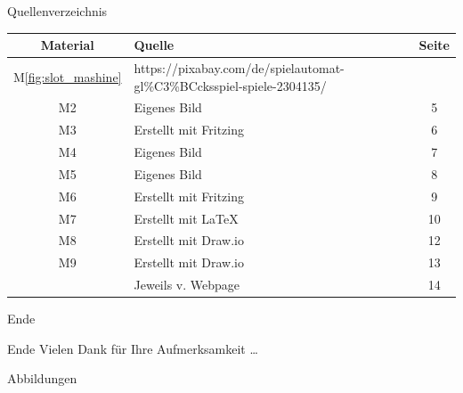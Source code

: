 \documentclass[mathserif,9pt]{article}
\begin{document}
    \begin{frame}{Quellenverzeichnis}
        \begin{block}{}
            \footnotesize
            \begin{tabular}{clc}
                Material & Quelle & Seite \\
                \hline
                M\ref{fig:slot_mashine} & https://pixabay.com/de/spielautomat-gl\%C3\%BCcksspiel-spiele-2304135/ & \pageref{fig:slot_mashine} \\
                M2 & Eigenes Bild & 5 \\
                M3 & Erstellt mit Fritzing & 6 \\
                M4 & Eigenes Bild & 7 \\
                M5 & Eigenes Bild & 8 \\
                M6 & Erstellt mit Fritzing & 9 \\
                M7 & Erstellt mit \LaTeX & 10 \\
                M8 & Erstellt mit Draw.io & 12 \\
                M9 & Erstellt mit Draw.io & 13 \\
                & Jeweils v. Webpage & 14
            \end{tabular}
        \end{block}
    \end{frame}
    
    \begin{frame}{Ende}
        \begin{block}{Ende}
            Vielen Dank für Ihre Aufmerksamkeit \ldots
        \end{block}
    \end{frame}

    \begin{frame}{Abbildungen}
    \end{frame}

\end{document}
